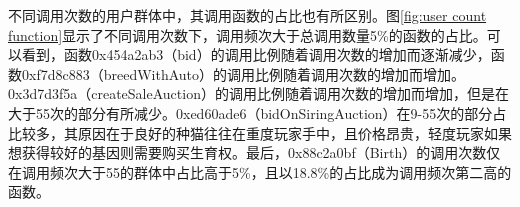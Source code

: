 \documentclass{myreport}
\begin{document}
不同调用次数的用户群体中，其调用函数的占比也有所区别。图\ref{fig:user count function}显示了不同调用次数下，调用频次大于总调用数量5\%的函数的占比。可以看到，函数0x454a2ab3（bid）的调用比例随着调用次数的增加而逐渐减少，函数0xf7d8c883（breedWithAuto）的调用比例随着调用次数的增加而增加。0x3d7d3f5a（createSaleAuction）的调用比例随着调用次数的增加而增加，但是在大于55次的部分有所减少。0xed60ade6（bidOnSiringAuction）在9-55次的部分占比较多，其原因在于良好的种猫往往在重度玩家手中，且价格昂贵，轻度玩家如果想获得较好的基因则需要购买生育权。最后，0x88c2a0bf（Birth）的调用次数仅在调用频次大于55的群体中占比高于5\%，且以18.8\%的占比成为调用频次第二高的函数。


\begin{figure}[!h]
	\centering
	\hspace{0 pt}

\end{figure}
\end{document}
